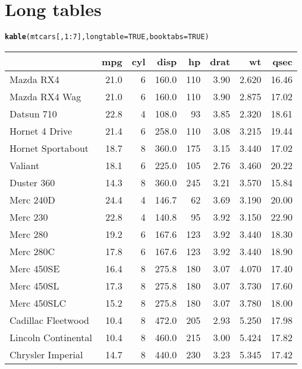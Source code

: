 \documentclass{article}\usepackage[]{graphicx}\usepackage[]{color}
\makeatletter
\newcommand{\hlnum}[1]{\textcolor[rgb]{0.686,0.059,0.569}{#1}}%
\newcommand{\hlopt}[1]{\textcolor[rgb]{0,0,0}{#1}}%
\newcommand{\hlstd}[1]{\textcolor[rgb]{0.345,0.345,0.345}{#1}}%
\newcommand{\hlkwc}[1]{\textcolor[rgb]{0.333,0.667,0.333}{#1}}%
\newcommand{\hlkwd}[1]{\textcolor[rgb]{0.737,0.353,0.396}{\textbf{#1}}}%
\newenvironment{kframe}{%
 \def\at@end@of@kframe{}%
 \ifinner\ifhmode%
  \def\at@end@of@kframe{\end{minipage}}%
  \begin{minipage}{\columnwidth}%
 \fi\fi%
 \def\FrameCommand##1{\hskip\@totalleftmargin \hskip-\fboxsep
 \colorbox{shadecolor}{##1}\hskip-\fboxsep
     \hskip-\linewidth \hskip-\@totalleftmargin \hskip\columnwidth}%
 \MakeFramed {\advance\hsize-\width
   \@totalleftmargin\z@ \linewidth\hsize
   \@setminipage}}%
 {\par\unskip\endMakeFramed%
 \at@end@of@kframe}
\makeatother
\begin{document}
\section{Long tables}

\begin{kframe}
\begin{alltt}
\hlkwd{kable}\hlstd{(mtcars[,} \hlnum{1}\hlopt{:}\hlnum{7}\hlstd{],} \hlkwc{longtable} \hlstd{=} \hlnum{TRUE}\hlstd{,} \hlkwc{booktabs} \hlstd{=} \hlnum{TRUE}\hlstd{)}
\end{alltt}
\end{kframe}
\begin{longtable}{lrrrrrrr}
\toprule
  & mpg & cyl & disp & hp & drat & wt & qsec\\
\midrule
Mazda RX4 & 21.0 & 6 & 160.0 & 110 & 3.90 & 2.620 & 16.46\\
\midrule
Mazda RX4 Wag & 21.0 & 6 & 160.0 & 110 & 3.90 & 2.875 & 17.02\\
\midrule
Datsun 710 & 22.8 & 4 & 108.0 &  93 & 3.85 & 2.320 & 18.61\\
\midrule
Hornet 4 Drive & 21.4 & 6 & 258.0 & 110 & 3.08 & 3.215 & 19.44\\
\midrule
Hornet Sportabout & 18.7 & 8 & 360.0 & 175 & 3.15 & 3.440 & 17.02\\
\midrule
Valiant & 18.1 & 6 & 225.0 & 105 & 2.76 & 3.460 & 20.22\\
\midrule
Duster 360 & 14.3 & 8 & 360.0 & 245 & 3.21 & 3.570 & 15.84\\
\midrule
Merc 240D & 24.4 & 4 & 146.7 &  62 & 3.69 & 3.190 & 20.00\\
\midrule
Merc 230 & 22.8 & 4 & 140.8 &  95 & 3.92 & 3.150 & 22.90\\
\midrule
Merc 280 & 19.2 & 6 & 167.6 & 123 & 3.92 & 3.440 & 18.30\\
\midrule
Merc 280C & 17.8 & 6 & 167.6 & 123 & 3.92 & 3.440 & 18.90\\
\midrule
Merc 450SE & 16.4 & 8 & 275.8 & 180 & 3.07 & 4.070 & 17.40\\
\midrule
Merc 450SL & 17.3 & 8 & 275.8 & 180 & 3.07 & 3.730 & 17.60\\
\midrule
Merc 450SLC & 15.2 & 8 & 275.8 & 180 & 3.07 & 3.780 & 18.00\\
\midrule
Cadillac Fleetwood & 10.4 & 8 & 472.0 & 205 & 2.93 & 5.250 & 17.98\\
\midrule
Lincoln Continental & 10.4 & 8 & 460.0 & 215 & 3.00 & 5.424 & 17.82\\
\midrule
Chrysler Imperial & 14.7 & 8 & 440.0 & 230 & 3.23 & 5.345 & 17.42\\

\end{longtable}
\end{document}
